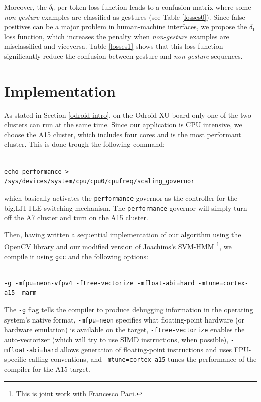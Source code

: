 Moreover, the $\delta_0$ per-token loss function leads to a confusion matrix where some \textit{non-gesture} examples are classified as gestures (see Table \ref{losses0}). Since false positives can be a major problem in human-machine interfaces, we propose the $\delta_1$ loss function, which increases the penalty when \textit{non-gesture} examples are misclassified and viceversa. Table \ref{losses1} shows that this loss function significantly reduce the confusion between gesture and \textit{non-gesture} sequences.


\section{Implementation}
\lstset{language=C++}

As stated in Section \ref{odroid-intro}, on the Odroid-XU board only one of the two clusters can run at the same time. Since our application is CPU intensive, we choose the A15 cluster, which includes four cores and is the most performant cluster. This is done trough the following command:
\begin{lstlisting}[frame=single]  % Start your code-block

echo performance > /sys/devices/system/cpu/cpu0/cpufreq/scaling_governor
\end{lstlisting}
which basically activates the \verb+performance+ governor as the controller for the big.LITTLE switching mechanism. The \verb+performance+ governor will simply turn off the A7 cluster and turn on the A15 cluster.

Then, having written a sequential implementation of our algorithm using the OpenCV library and our modified version of Joachims's SVM-HMM \cite{joachims} \footnote{This is joint work with Francesco Paci.}, we compile it using \verb+gcc+ and the following options:
\begin{lstlisting}[frame=single]  % Start your code-block

-g -mfpu=neon-vfpv4 -ftree-vectorize -mfloat-abi=hard -mtune=cortex-a15 -marm
\end{lstlisting}

The \verb+-g+ flag tells the compiler to produce debugging information in the operating system's native format, \verb+-mfpu=neon+  specifies what floating-point hardware (or hardware emulation) is available on the target, \verb+-ftree-vectorize+ enables the auto-vectorizer (which will try to use SIMD instructions, when possible), \verb+-mfloat-abi=hard+ allows generation of floating-point instructions and uses FPU-specific calling conventions, and \verb+-mtune=cortex-a15+ tunes the performance of the compiler for the A15 target.

